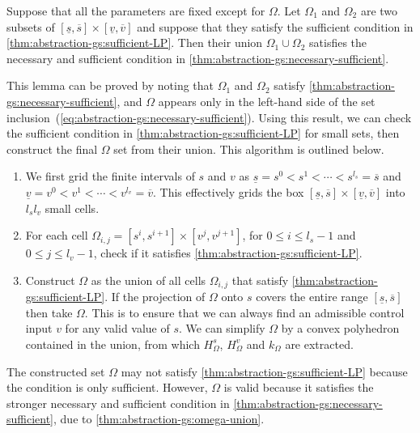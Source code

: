 \begin{lemma}
  \label{thm:abstraction-gs:omega-union}
  Suppose that all the parameters are fixed except for $\Omega$.
  Let $\Omega_{1}$ and $\Omega_{2}$ are two subsets of $[\underline{s}, \overbar{s}] \times[\underline{v}, \overbar{v}]$ and suppose that they satisfy the sufficient condition in \cref{thm:abstraction-gs:sufficient-LP}.
  Then their union $\Omega_{1} \cup \Omega_{2}$ satisfies the necessary and sufficient condition in \cref{thm:abstraction-gs:necessary-sufficient}.
\end{lemma}
This lemma can be proved by noting that $\Omega_{1}$ and $\Omega_{2}$ satisfy \cref{thm:abstraction-gs:necessary-sufficient}, and $\Omega$ appears only in the left-hand side of the set inclusion~(\cref{eq:abstraction-gs:necessary-sufficient}).
Using this result, we can check the sufficient condition in \cref{thm:abstraction-gs:sufficient-LP} for small sets, then construct the final $\Omega$ set from their union.
This algorithm is outlined below.
\begin{enumerate}
\item We first grid the finite intervals of $s$ and $v$ as $\underline{s} = s^{0} < s^{1} < \cdots < s^{l_{s}} = \overbar{s}$ and $\underline{v} = v^{0} < v^{1} < \cdots < v^{l_{v}} = \overbar{v}$.  This effectively grids the box $[\underline{s}, \overbar{s}] \times[\underline{v}, \overbar{v}]$ into $l_{s} l_{v}$ small cells.
\item For each cell $\Omega_{i,j} = [s^{i}, s^{i+1}] \times[v^{j}, v^{j+1}]$, for $0 \leqslant i \leqslant l_{s}-1$ and $0 \leqslant j \leqslant l_{v}-1$, check if it satisfies \cref{thm:abstraction-gs:sufficient-LP}.
\item Construct $\Omega$ as the union of all cells $\Omega_{i,j}$ that satisfy \cref{thm:abstraction-gs:sufficient-LP}.  If the projection of $\Omega$ onto $s$ covers the entire range $[\underline{s}, \overbar{s}]$ then take $\Omega$.  This is to ensure that we can always find an admissible control input $v$ for any valid value of $s$.  We can simplify $\Omega$ by a convex polyhedron contained in the union, from which $H_{\Omega}^{s}$, $H_{\Omega}^{v}$ and $k_{\Omega}$ are extracted.
\end{enumerate}

\begin{remark}
  The constructed set $\Omega$ may not satisfy \cref{thm:abstraction-gs:sufficient-LP} because the condition is only sufficient.
  However, $\Omega$ is valid because it satisfies the stronger necessary and sufficient condition in \cref{thm:abstraction-gs:necessary-sufficient}, due to \cref{thm:abstraction-gs:omega-union}.
\end{remark}






